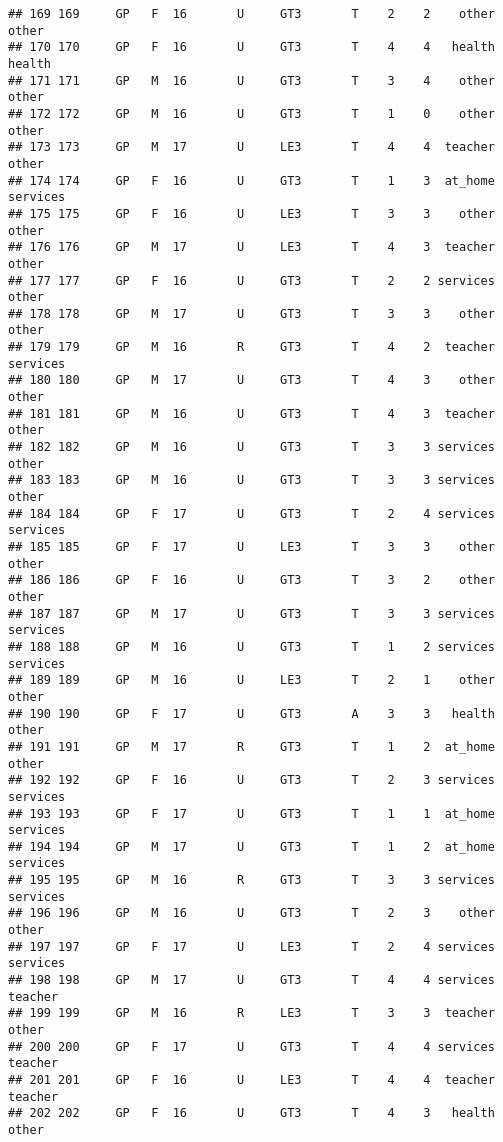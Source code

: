 \documentclass[]{article}
\begin{document}
\begin{verbatim}
## 169 169     GP   F  16       U     GT3       T    2    2    other    other
## 170 170     GP   F  16       U     GT3       T    4    4   health   health
## 171 171     GP   M  16       U     GT3       T    3    4    other    other
## 172 172     GP   M  16       U     GT3       T    1    0    other    other
## 173 173     GP   M  17       U     LE3       T    4    4  teacher    other
## 174 174     GP   F  16       U     GT3       T    1    3  at_home services
## 175 175     GP   F  16       U     LE3       T    3    3    other    other
## 176 176     GP   M  17       U     LE3       T    4    3  teacher    other
## 177 177     GP   F  16       U     GT3       T    2    2 services    other
## 178 178     GP   M  17       U     GT3       T    3    3    other    other
## 179 179     GP   M  16       R     GT3       T    4    2  teacher services
## 180 180     GP   M  17       U     GT3       T    4    3    other    other
## 181 181     GP   M  16       U     GT3       T    4    3  teacher    other
## 182 182     GP   M  16       U     GT3       T    3    3 services    other
## 183 183     GP   M  16       U     GT3       T    3    3 services    other
## 184 184     GP   F  17       U     GT3       T    2    4 services services
## 185 185     GP   F  17       U     LE3       T    3    3    other    other
## 186 186     GP   F  16       U     GT3       T    3    2    other    other
## 187 187     GP   M  17       U     GT3       T    3    3 services services
## 188 188     GP   M  16       U     GT3       T    1    2 services services
## 189 189     GP   M  16       U     LE3       T    2    1    other    other
## 190 190     GP   F  17       U     GT3       A    3    3   health    other
## 191 191     GP   M  17       R     GT3       T    1    2  at_home    other
## 192 192     GP   F  16       U     GT3       T    2    3 services services
## 193 193     GP   F  17       U     GT3       T    1    1  at_home services
## 194 194     GP   M  17       U     GT3       T    1    2  at_home services
## 195 195     GP   M  16       R     GT3       T    3    3 services services
## 196 196     GP   M  16       U     GT3       T    2    3    other    other
## 197 197     GP   F  17       U     LE3       T    2    4 services services
## 198 198     GP   M  17       U     GT3       T    4    4 services  teacher
## 199 199     GP   M  16       R     LE3       T    3    3  teacher    other
## 200 200     GP   F  17       U     GT3       T    4    4 services  teacher
## 201 201     GP   F  16       U     LE3       T    4    4  teacher  teacher
## 202 202     GP   F  16       U     GT3       T    4    3   health    other

\end{verbatim}
\end{document}
